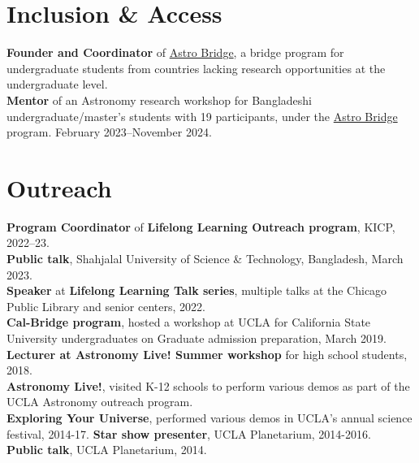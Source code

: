 \documentclass[margin, line]{res}
\begin{document}
\begin{resume}
%
%
%


\section{\sc Inclusion \& Access}
{\bf Founder and Coordinator} of \href{https://www.astrobridge.org/}{Astro Bridge}, a bridge program for undergraduate students from countries lacking research opportunities at the undergraduate level. \\
{\bf Mentor} of an Astronomy research workshop for Bangladeshi undergraduate/master's students with 19 participants, under the \href{https://www.astrobridge.org/projects/bdlensing}{Astro Bridge} program. February 2023--November 2024. \\ 

\section{\sc Outreach}
{\bf Program Coordinator} of {\bf Lifelong Learning Outreach program}, KICP, 2022--23. \\
{\bf Public talk}, Shahjalal University of Science \& Technology, Bangladesh, March 2023. \\
{\bf Speaker} at {\bf Lifelong Learning Talk series}, multiple talks at the Chicago Public Library and senior centers, 2022. \\
{\bf Cal-Bridge program}, hosted a workshop at UCLA for California State University undergraduates on Graduate admission preparation, March 2019. \\
{\bf Lecturer at Astronomy Live! Summer workshop} for high school students, 2018. \\
{\bf Astronomy Live!}, visited K-12 schools to perform various demos as part of the UCLA Astronomy outreach program. \\
{\bf Exploring Your Universe}, performed various demos in UCLA's annual science festival, 2014-17.
{\bf Star show presenter}, UCLA Planetarium, 2014-2016. \\
{\bf Public talk}, UCLA Planetarium, 2014. \\



\end{resume}
\end{document}
